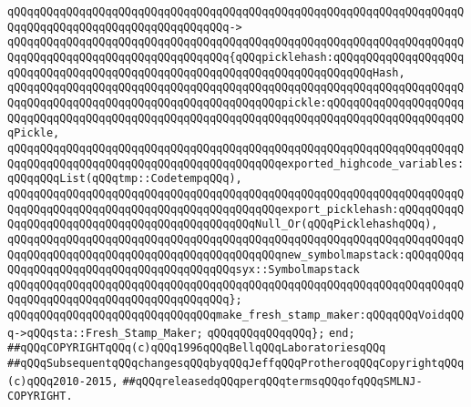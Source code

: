 \verb|qQQqqQQqqQQqqQQqqQQqqQQqqQQqqQQqqQQqqQQqqQQqqQQqqQQqqQQqqQQqqQQqqQQqqQQqqQQqqQQqqQQqqQQqqQQqqQQqqQQqqQQq->|\newline
\verb|qQQqqQQqqQQqqQQqqQQqqQQqqQQqqQQqqQQqqQQqqQQqqQQqqQQqqQQqqQQqqQQqqQQqqQQqqQQqqQQqqQQqqQQqqQQqqQQqqQQqqQQq{qQQqpicklehash:qQQqqQQqqQQqqQQqqQQqqQQqqQQqqQQqqQQqqQQqqQQqqQQqqQQqqQQqqQQqqQQqqQQqqQQqqQQqHash,|\newline
\verb|qQQqqQQqqQQqqQQqqQQqqQQqqQQqqQQqqQQqqQQqqQQqqQQqqQQqqQQqqQQqqQQqqQQqqQQqqQQqqQQqqQQqqQQqqQQqqQQqqQQqqQQqqQQqqQQqpickle:qQQqqQQqqQQqqQQqqQQqqQQqqQQqqQQqqQQqqQQqqQQqqQQqqQQqqQQqqQQqqQQqqQQqqQQqqQQqqQQqqQQqqQQqqQQqPickle,|\newline
\verb|qQQqqQQqqQQqqQQqqQQqqQQqqQQqqQQqqQQqqQQqqQQqqQQqqQQqqQQqqQQqqQQqqQQqqQQqqQQqqQQqqQQqqQQqqQQqqQQqqQQqqQQqqQQqqQQqexported_highcode_variables:qQQqqQQqList(qQQqtmp::CodetempqQQq),|\newline
\verb|qQQqqQQqqQQqqQQqqQQqqQQqqQQqqQQqqQQqqQQqqQQqqQQqqQQqqQQqqQQqqQQqqQQqqQQqqQQqqQQqqQQqqQQqqQQqqQQqqQQqqQQqqQQqqQQqexport_picklehash:qQQqqQQqqQQqqQQqqQQqqQQqqQQqqQQqqQQqqQQqqQQqqQQqNull_Or(qQQqPicklehashqQQq),|\newline
\verb|qQQqqQQqqQQqqQQqqQQqqQQqqQQqqQQqqQQqqQQqqQQqqQQqqQQqqQQqqQQqqQQqqQQqqQQqqQQqqQQqqQQqqQQqqQQqqQQqqQQqqQQqqQQqqQQqnew_symbolmapstack:qQQqqQQqqQQqqQQqqQQqqQQqqQQqqQQqqQQqqQQqqQQqsyx::Symbolmapstack|\newline
\verb|qQQqqQQqqQQqqQQqqQQqqQQqqQQqqQQqqQQqqQQqqQQqqQQqqQQqqQQqqQQqqQQqqQQqqQQqqQQqqQQqqQQqqQQqqQQqqQQqqQQqqQQq};|\newline
\newline
\verb|qQQqqQQqqQQqqQQqqQQqqQQqqQQqqQQqmake_fresh_stamp_maker:qQQqqQQqVoidqQQq->qQQqsta::Fresh_Stamp_Maker;|\newline
\verb|qQQqqQQqqQQqqQQq};|\newline
\verb|end;|\newline
\newline
\newline
\verb|##qQQqCOPYRIGHTqQQq(c)qQQq1996qQQqBellqQQqLaboratoriesqQQq|\newline
\verb|##qQQqSubsequentqQQqchangesqQQqbyqQQqJeffqQQqProtheroqQQqCopyrightqQQq(c)qQQq2010-2015,|\newline
\verb|##qQQqreleasedqQQqperqQQqtermsqQQqofqQQqSMLNJ-COPYRIGHT.|\newline

